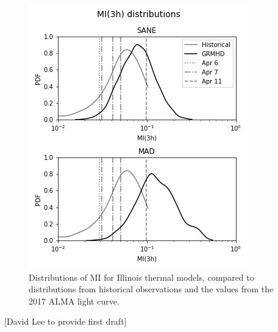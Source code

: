 
\begin{figure}
  \centering
    \includegraphics[width=\columnwidth]{./figures/mi_dist.png}
  \caption{Distributions of MI for Illinois thermal models, compared to distributions from historical observations and the values from the 2017 ALMA light curve. }
  \label{fig:cmp_ALMA_var}
\end{figure}

[David Lee to provide first draft]


